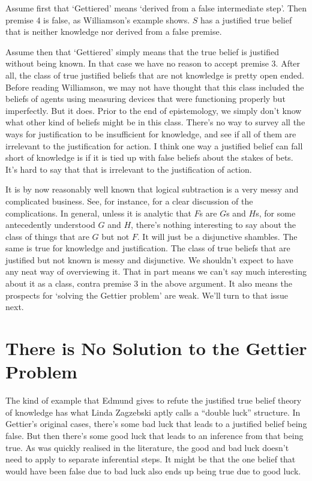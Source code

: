 Assume first that `Gettiered' means `derived from a false intermediate step'. Then premise 4 is false, as Williamson's example shows. $S$ has a justified true belief that is neither knowledge nor derived from a false premise.

Assume then that `Gettiered' simply means that the true belief is justified without being known. In that case we have no reason to accept premise 3. After all, the class of true justified beliefs that are not knowledge is pretty open ended. Before reading Williamson, we may not have thought that this class included the beliefs of agents using measuring devices that were functioning properly but imperfectly. But it does. Prior to the end of epistemology, we simply don't know what other kind of beliefs might be in this class. There's no way to survey all the ways for justification to be insufficient for knowledge, and see if all of them are irrelevant to the justification for action. I think one way a justified belief can fall short of knowledge is if it is tied up with false beliefs about the stakes of bets. It's hard to say that that is irrelevant to the justification of action.

It is by now reasonably well known that logical subtraction is a very messy and complicated business. See, for instance, \citet{Humberstone2000} for a clear discussion of the complications. In general, unless it is analytic that $F$s are $G$s and $H$s, for some antecedently understood $G$ and $H$, there's nothing interesting to say about the class of things that are $G$ but not $F$. It will just be a disjunctive shambles. The same is true for knowledge and justification. The class of true beliefs that are justified but not known is messy and disjunctive. We shouldn't expect to have any neat way of overviewing it. That in part means we can't say much interesting about it as a class, contra premise 3 in the above argument. It also means the prospects for `solving the Gettier problem' are weak. We'll turn to that issue next.

\section{There is No Solution to the Gettier Problem}

The kind of example that Edmund \citet{Gettier1963} gives to refute the justified true belief theory of knowledge has what Linda  Zagzebski \citeyearpar[117]{Zagzebski2009} aptly calls a ``double luck'' structure. In Gettier's original cases, there's some bad luck that leads to a justified belief being false. But then there's some good luck that leads to an inference from that being true. As was quickly realised in the literature, the good and bad luck doesn't need to apply to separate inferential steps. It might be that the one belief that would have been false due to bad luck also ends up being true due to good luck.

